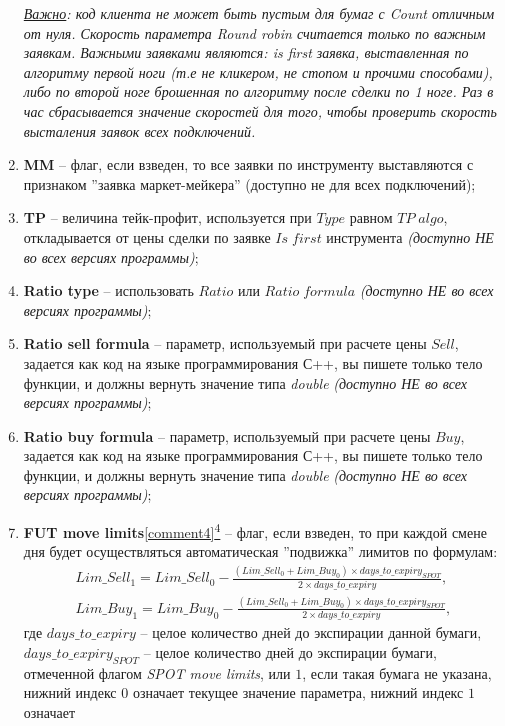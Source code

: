 \begin{enumerate}
		\textit{\underline{Важно}: код клиента не может быть пустым для бумаг с \textit{Count} отличным от нуля.
Скорость параметра Round robin считается только по важным заявкам. Важными заявками являются: is first заявка, выставленная по алгоритму первой ноги (т.е не кликером, не стопом и прочими способами), либо по второй ноге брошенная по алгоритму после сделки по 1 ноге. Раз в час сбрасывается значение скоростей для того, чтобы проверить скорость высталения заявок всех подключений. }
	\item \textbf{MM} -- флаг, если взведен, то все заявки по инструменту выставляются с признаком ''заявка маркет-мейкера'' (доступно не для всех подключений);
\ifdefined \Ramiz
	\item \textbf{TP} -- величина тейк-профит, используется при $Type$ равном $TP \; algo$, откладывается от цены сделки по заявке $Is \; first$ инструмента \textit{(доступно НЕ во всех версиях программы)};
\else
\fi
	\item \textbf{Ratio type} -- использовать $Ratio$ или $Ratio \; formula$ \textit{(доступно НЕ во всех версиях программы)};
	\item \textbf{Ratio sell formula} -- параметр, используемый при расчете цены $Sell$, задается как код на языке программирования С++, вы пишете только тело функции,
		и должны вернуть значение типа \textit{double} \textit{(доступно НЕ во всех версиях программы)};
	\item \textbf{Ratio buy formula} -- параметр, используемый при расчете цены $Buy$, задается как код на языке программирования С++, вы пишете только тело функции,
		и должны вернуть значение типа \textit{double} \textit{(доступно НЕ во всех версиях программы)};
	\item \textbf{FUT move limits}\hyperref[comment4]{\ref{comment4}\textsuperscript{4}} -- флаг, если взведен, то при каждой смене дня будет осуществляться автоматическая ''подвижка'' лимитов по формулам:
		\begin{align*}
			Lim\_Sell_1 = Lim\_Sell_0 - \frac{\left( Lim\_Sell_0 + Lim\_Buy_0 \right) \times days\_to\_expiry_{SPOT}}{2 \times days\_to\_expiry},\\
			Lim\_Buy_1 = Lim\_Buy_0 - \frac{\left( Lim\_Sell_0 + Lim\_Buy_0 \right) \times days\_to\_expiry_{SPOT}}{2 \times days\_to\_expiry},
		\end{align*}
		где $days\_to\_expiry$ -- целое количество дней до экспирации данной бумаги, $days\_to\_expiry_{SPOT}$ -- целое количество дней до экспирации бумаги,
		отмеченной флагом \textit{SPOT move limits}, или $1$, если такая бумага не указана, нижний индекс $0$ означает текущее значение параметра, нижний индекс $1$ означает

\end{enumerate}

